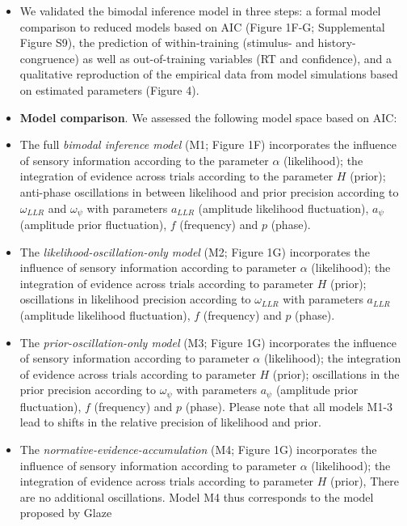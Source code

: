 \documentclass[
]{article}
\begin{document}
\begin{itemize}
\item
  We validated the bimodal inference model in three steps: a formal
  model comparison to reduced models based on AIC (Figure 1F-G;
  Supplemental Figure S9), the prediction of within-training (stimulus-
  and history-congruence) as well as out-of-training variables (RT and
  confidence), and a qualitative reproduction of the empirical data from
  model simulations based on estimated parameters (Figure 4).
\item
  \textbf{Model comparison}. We assessed the following model space based
  on AIC:
\item
  The full \emph{bimodal inference model} (M1; Figure 1F) incorporates
  the influence of sensory information according to the parameter
  \(\alpha\) (likelihood); the integration of evidence across trials
  according to the parameter \(H\) (prior); anti-phase oscillations in
  between likelihood and prior precision according to \(\omega_{LLR}\)
  and \(\omega_{\psi}\) with parameters \(a_{LLR}\) (amplitude
  likelihood fluctuation), \(a_{\psi}\) (amplitude prior fluctuation),
  \(f\) (frequency) and \(p\) (phase).
\item
  The \emph{likelihood-oscillation-only model} (M2; Figure 1G)
  incorporates the influence of sensory information according to
  parameter \(\alpha\) (likelihood); the integration of evidence across
  trials according to parameter \(H\) (prior); oscillations in
  likelihood precision according to \(\omega_{LLR}\) with parameters
  \(a_{LLR}\) (amplitude likelihood fluctuation), \(f\) (frequency) and
  \(p\) (phase).
\item
  The \emph{prior-oscillation-only model} (M3; Figure 1G) incorporates
  the influence of sensory information according to parameter \(\alpha\)
  (likelihood); the integration of evidence across trials according to
  parameter \(H\) (prior); oscillations in the prior precision according
  to \(\omega_{\psi}\) with parameters \(a_{\psi}\) (amplitude prior
  fluctuation), \(f\) (frequency) and \(p\) (phase). Please note that
  all models M1-3 lead to shifts in the relative precision of likelihood
  and prior.
\item
  The \emph{normative-evidence-accumulation} (M4; Figure 1G)
  incorporates the influence of sensory information according to
  parameter \(\alpha\) (likelihood); the integration of evidence across
  trials according to parameter \(H\) (prior), There are no additional
  oscillations. Model M4 thus corresponds to the model proposed by Glaze

\end{itemize}
\end{document}
